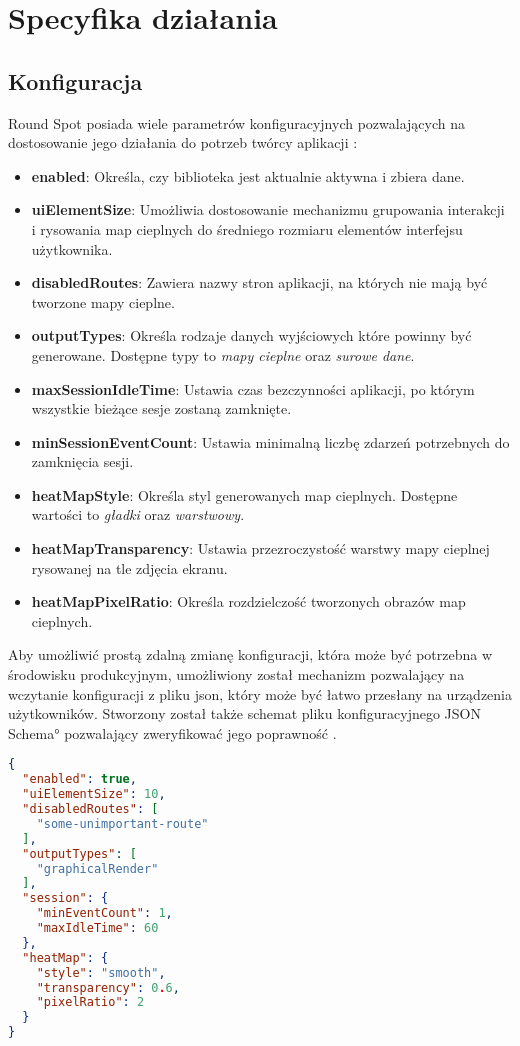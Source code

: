 \section{Specyfika działania}

\subsection{Konfiguracja}
\label{sec:rs_config}
Round Spot posiada wiele parametrów konfiguracyjnych pozwalających na dostosowanie jego działania do potrzeb twórcy aplikacji \cite{RoundSpot_Config_Docs}:
\begin{itemize}
	\item {\bf enabled}: Określa, czy biblioteka jest aktualnie aktywna i zbiera dane.
	\item {\bf uiElementSize}: Umożliwia dostosowanie mechanizmu grupowania interakcji i rysowania map cieplnych do średniego rozmiaru elementów interfejsu użytkownika.
	\item {\bf disabledRoutes}: Zawiera nazwy stron aplikacji, na których nie mają być tworzone mapy cieplne.
	\item {\bf outputTypes}: Określa rodzaje danych wyjściowych które powinny być generowane. Dostępne typy to {\it mapy cieplne} oraz {\it surowe dane}.
	\item {\bf maxSessionIdleTime}: Ustawia czas bezczynności aplikacji, po którym wszystkie bieżące sesje zostaną zamknięte.
	\item {\bf minSessionEventCount}: Ustawia minimalną liczbę zdarzeń potrzebnych do zamknięcia sesji.
	\item {\bf heatMapStyle}: Określa styl generowanych map cieplnych. Dostępne wartości to {\it gładki} oraz {\it warstwowy}.
	\item {\bf heatMapTransparency}: Ustawia przezroczystość warstwy mapy cieplnej rysowanej na tle zdjęcia ekranu. 
	\item {\bf heatMapPixelRatio}: Określa rozdzielczość tworzonych obrazów map cieplnych.
\end{itemize}

Aby umożliwić prostą zdalną zmianę konfiguracji, która może być potrzebna w środowisku produkcyjnym, umożliwiony został mechanizm pozwalający na wczytanie konfiguracji z pliku json, który może być łatwo przesłany na urządzenia użytkowników. Stworzony został także schemat pliku konfiguracyjnego \ang{JSON Schema} pozwalający zweryfikować jego poprawność \cite{RoundSpot_Config_Schema}.

\begin{lstlisting}[language=json,caption={Przykładowy plik konfiguracyjny w formacie json},label=lst:rs_config_json]
{
  "enabled": true,
  "uiElementSize": 10,
  "disabledRoutes": [
    "some-unimportant-route"
  ],
  "outputTypes": [
    "graphicalRender"
  ],
  "session": {
    "minEventCount": 1,
    "maxIdleTime": 60
  },
  "heatMap": {
    "style": "smooth",
    "transparency": 0.6,
    "pixelRatio": 2
  }
}
\end{lstlisting}

